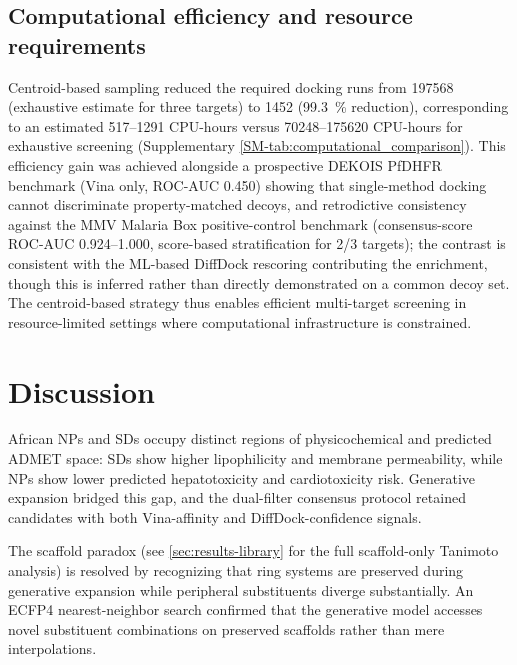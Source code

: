 \documentclass[journal=jcisd8,manuscript=article]{achemso}
\begin{document}
\subsection{Computational efficiency and resource requirements}
\label{sec:computational_efficiency}

Centroid-based sampling reduced the required docking runs from \num{197568} (exhaustive estimate for three targets) to \num{1452} (\qty{99.3}{\percent} reduction), corresponding
to an estimated \numrange{517}{1291} CPU-hours versus \numrange{70248}{175620} CPU-hours for exhaustive screening (Supplementary
\cref{SM-tab:computational_comparison}). This efficiency gain was achieved alongside a prospective DEKOIS PfDHFR benchmark (Vina only, ROC-AUC \num{0.450})
showing that single-method docking cannot discriminate property-matched decoys, and retrodictive consistency against the MMV Malaria Box positive-control
benchmark (consensus-score ROC-AUC \numrange{0.924}{1.000}, score-based stratification for 2/3 targets); the contrast is consistent with the ML-based DiffDock
rescoring contributing the enrichment, though this is inferred rather than directly demonstrated on a common decoy set. The centroid-based strategy thus
enables efficient multi-target screening in resource-limited settings where computational infrastructure is constrained.

\section{Discussion}

African NPs and SDs occupy distinct regions of physicochemical and predicted ADMET space: SDs show higher lipophilicity and membrane permeability, while NPs
show lower predicted hepatotoxicity and cardiotoxicity risk. Generative expansion bridged this gap, and the dual-filter consensus protocol retained candidates
with both Vina-affinity and DiffDock-confidence signals.

The scaffold paradox (see \cref{sec:results-library} for the full scaffold-only Tanimoto analysis) is resolved by recognizing that ring systems are preserved
during generative expansion while peripheral substituents diverge substantially. An ECFP4 nearest-neighbor search confirmed that the generative model accesses
novel substituent combinations on preserved scaffolds rather than mere interpolations.
\end{document}

